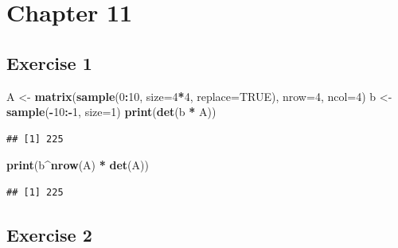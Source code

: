 \documentclass[
]{book}
\newenvironment{Shaded}{\begin{snugshade}}{\end{snugshade}}
\newcommand{\DataTypeTok}[1]{\textcolor[rgb]{0.13,0.29,0.53}{#1}}
\newcommand{\DecValTok}[1]{\textcolor[rgb]{0.00,0.00,0.81}{#1}}
\newcommand{\KeywordTok}[1]{\textcolor[rgb]{0.13,0.29,0.53}{\textbf{#1}}}
\newcommand{\NormalTok}[1]{#1}
\newcommand{\OperatorTok}[1]{\textcolor[rgb]{0.81,0.36,0.00}{\textbf{#1}}}
\newcommand{\OtherTok}[1]{\textcolor[rgb]{0.56,0.35,0.01}{#1}}
\newcommand{\StringTok}[1]{\textcolor[rgb]{0.31,0.60,0.02}{#1}}
\begin{document}
\hypertarget{chapter-11-1}{%
\section*{Chapter 11}\label{chapter-11-1}}

\hypertarget{exercise-1-7}{%
\subsection*{Exercise 1}\label{exercise-1-7}}

\begin{Shaded}
\begin{Highlighting}[]
\NormalTok{A \textless{}{-}}\StringTok{ }\KeywordTok{matrix}\NormalTok{(}\KeywordTok{sample}\NormalTok{(}\DecValTok{0}\OperatorTok{:}\DecValTok{10}\NormalTok{, }\DataTypeTok{size=}\DecValTok{4}\OperatorTok{*}\DecValTok{4}\NormalTok{, }\DataTypeTok{replace=}\OtherTok{TRUE}\NormalTok{), }\DataTypeTok{nrow=}\DecValTok{4}\NormalTok{, }\DataTypeTok{ncol=}\DecValTok{4}\NormalTok{)}
\NormalTok{b \textless{}{-}}\StringTok{ }\KeywordTok{sample}\NormalTok{(}\OperatorTok{{-}}\DecValTok{10}\OperatorTok{:{-}}\DecValTok{1}\NormalTok{, }\DataTypeTok{size=}\DecValTok{1}\NormalTok{)}
\KeywordTok{print}\NormalTok{(}\KeywordTok{det}\NormalTok{(b }\OperatorTok{*}\StringTok{ }\NormalTok{A))}
\end{Highlighting}
\end{Shaded}

\begin{verbatim}
## [1] 225
\end{verbatim}

\begin{Shaded}
\begin{Highlighting}[]
\KeywordTok{print}\NormalTok{(b}\OperatorTok{\^{}}\KeywordTok{nrow}\NormalTok{(A) }\OperatorTok{*}\StringTok{ }\KeywordTok{det}\NormalTok{(A))}
\end{Highlighting}
\end{Shaded}

\begin{verbatim}
## [1] 225
\end{verbatim}

\hypertarget{exercise-2-7}{%
\subsection*{Exercise 2}\label{exercise-2-7}}
\end{document}
